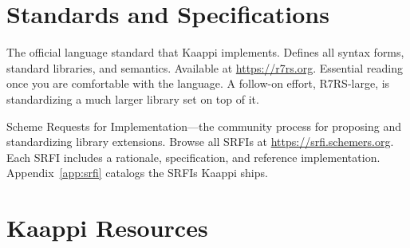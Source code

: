 \section{Standards and Specifications}

\begin{description}[leftmargin=1em, labelindent=0em]

\item[R7RS-small Report] The official language standard that Kaappi implements. Defines all syntax forms, standard libraries, and semantics. Available at \url{https://r7rs.org}. Essential reading once you are comfortable with the language. A follow-on effort, R7RS-large, is standardizing a much larger library set on top of it.

\item[SRFI Process] Scheme Requests for Implementation---the community process for proposing and standardizing library extensions. Browse all SRFIs at \url{https://srfi.schemers.org}. Each SRFI includes a rationale, specification, and reference implementation. Appendix~\ref{app:srfi} catalogs the \srfitotal{} SRFIs Kaappi ships.

\end{description}

\section{Kaappi Resources}

